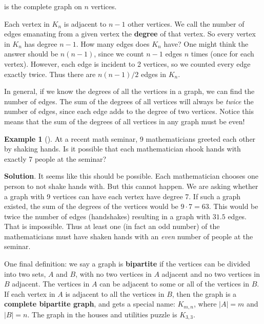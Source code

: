 \documentclass[10pt,]{book}
\newcommand{\terminology}[1]{\textbf{#1}}
\theoremstyle{plain}
\theoremstyle{definition}
\theoremstyle{definition}
\newtheorem{example}[theorem]{Example}
\theoremstyle{definition}
\numberwithin{equation}{chapter}
\begin{document}
 is the complete graph on \(n\) vertices.%
\par
\hypertarget{p-96}{}%
Each vertex in \(K_n\) is adjacent to \(n-1\) other vertices. We call the number of edges emanating from a given vertex the \terminology{degree} of that vertex. So every vertex in \(K_n\) has degree \(n-1\). How many edges does \(K_n\) have? One might think the answer should be \(n(n-1)\), since we count \(n-1\) edges \(n\) times (once for each vertex). However, each edge is incident to 2 vertices, so we counted every edge exactly twice. Thus there are \(n(n-1)/2\) edges in \(K_n\). %
\par
\hypertarget{p-97}{}%
In general, if we know the degrees of all the vertices in a graph, we can find the number of edges. The sum of the degrees of all vertices will always be \emph{twice} the number of edges, since each edge adds to the degree of two vertices. Notice this means that the sum of the degrees of all vertices in any graph must be even!%
\begin{example}[]\label{example-5}
\hypertarget{p-98}{}%
At a recent math seminar, 9 mathematicians greeted each other by shaking hands. Is it possible that each mathematician shook hands with exactly 7 people at the seminar?%
\par\smallskip%
\noindent\textbf{Solution}.\hypertarget{solution-8}{}\quad%
\hypertarget{p-99}{}%
It seems like this should be possible. Each mathematician chooses one person to not shake hands with. But this cannot happen. We are asking whether a graph with 9 vertices can have each vertex have degree 7. If such a graph existed, the sum of the degrees of the vertices would be \(9\cdot 7 = 63\). This would be twice the number of edges (handshakes) resulting in a graph with \(31.5\) edges. That is impossible. Thus at least one (in fact an odd number) of the mathematicians must have shaken hands with an \emph{even} number of people at the seminar.%
\end{example}
\hypertarget{p-100}{}%
One final definition: we say a graph is \terminology{bipartite} if the vertices can be divided into two sets, \(A\) and \(B\), with no two vertices in \(A\) adjacent and no two vertices in \(B\) adjacent. The vertices in \(A\) can be adjacent to some or all of the vertices in \(B\). If each vertex in \(A\) is adjacent to all the vertices in \(B\), then the graph is a \terminology{complete bipartite graph}, and gets a special name: \(K_{m,n}\), where \(|A| = m\) and \(|B| = n\). The graph in the houses and utilities puzzle is \(K_{3,3}\).%
\typeout{************************************************}
\typeout{************************************************}
\end{document}
